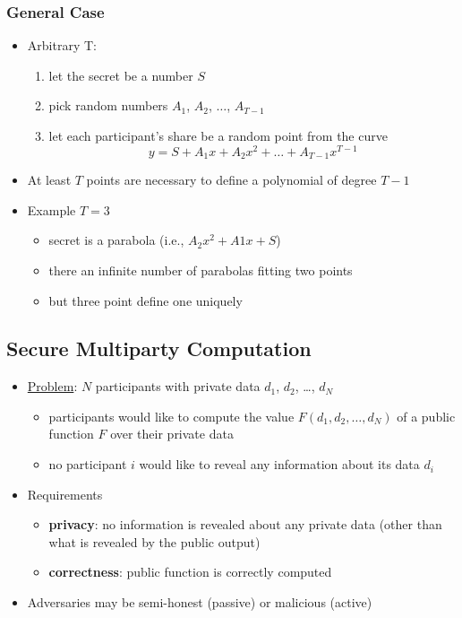 \documentclass[final]{article}
\begin{document}
\subsubsection*{General Case}
\begin{itemize}[nosep]
    \item Arbitrary T:
          \begin{enumerate}[nosep]
              \item let the secret be a number $S$
              \item pick random numbers $A_1$, $A_2$, $\dots$, $A_{T-1}$
              \item let each participant's share be a random point from the curve
                    \[y = S + A_1 x + A_2 x^2 + \dots + A_{T-1}x^{T-1}\]
          \end{enumerate}
    \item At least $T$ points are necessary to define a polynomial of degree $T - 1$
    \item Example $T = 3$
          \begin{itemize}[nosep]
              \item secret is a parabola (i.e., $A_2 x^2 + A1 x + S$)
              \item there an infinite number of parabolas fitting two points
              \item but three point define one uniquely
          \end{itemize}
\end{itemize}
\subsection{Secure Multiparty Computation}
\begin{itemize}[nosep]
    \item \underline{Problem}: $N$ participants with private data $d_1$, $d_2$, \dots, $d_N$
          \begin{itemize}[nosep]
              \item participants would like to compute the value $F(d_1, d_2, \dots, d_N)$ of a public function $F$ over their private data
              \item no participant $i$ would like to reveal any information about its data $d_i$
          \end{itemize}
    \item Requirements
          \begin{itemize}
              \item \textbf{privacy}: no information is revealed about any private data (other than what is revealed by the public output)
              \item \textbf{correctness}: public function is correctly computed
          \end{itemize}
    \item Adversaries may be semi-honest (passive) or malicious (active)
\end{itemize}
\end{document}
